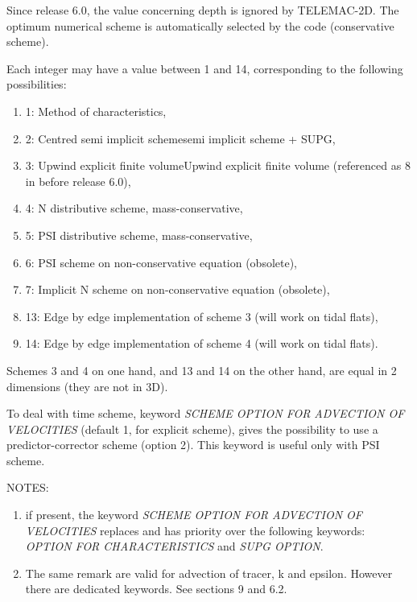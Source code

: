  Since release 6.0, the value concerning depth is ignored by TELEMAC-2D. The optimum numerical scheme is automatically selected by the code (conservative scheme).

 Each integer may have a value between 1 and 14, corresponding to the following possibilities:

\begin{enumerate}
\item[\nonumber]  1: Method of characteristics,

\item [\nonumber]  2: Centred semi implicit schemesemi implicit scheme + SUPG,

\item[\nonumber]   3:  Upwind explicit finite volumeUpwind explicit finite volume (referenced as 8 in before release 6.0),

\item [\nonumber]  4: N distributive scheme, mass-conservative,

\item [\nonumber]  5:  PSI distributive scheme, mass-conservative,

\item [\nonumber]  6:  PSI scheme on non-conservative equation (obsolete),

\item [\nonumber]  7: Implicit N scheme on non-conservative equation (obsolete),

\item [\nonumber]  13: Edge by edge implementation of scheme 3 (will work on tidal flats),

\item [\nonumber]  14: Edge by edge implementation of scheme 4 (will work on tidal flats).
\end{enumerate}

 Schemes 3 and 4 on one hand, and 13 and 14 on the other hand, are equal in 2 dimensions (they are not in 3D).

 To deal with time scheme, keyword \textit{SCHEME OPTION FOR ADVECTION OF VELOCITIES} (default 1, for explicit scheme), gives the possibility to use a predictor-corrector scheme (option 2). This keyword is useful only with PSI scheme.

 NOTES:

\begin{enumerate}
\item  if present, the keyword \textit{SCHEME OPTION FOR ADVECTION OF VELOCITIES} replaces and has priority over the following keywords: \textit{OPTION FOR CHARACTERISTICS} and \textit{SUPG OPTION}.

\item  The same remark are valid for advection of tracer, k and epsilon. However there are dedicated keywords. See sections 9 and 6.2.
\end{enumerate}

